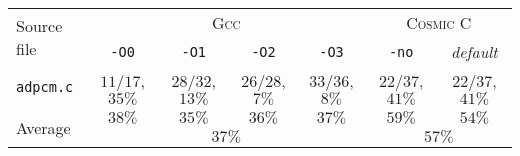 \begin{tabular}{ |l| |c|c|c|c| |c|c| }
  \hline
  \multirow{2}{*}{Source file}
  & \multicolumn{4}{c||}{\textsc{Gcc}}
  & \multicolumn{2}{c|}{\textsc{Cosmic C}}

  \\\cline{2-7}
  & \multicolumn{1}{c|}{\texttt{-O0}} & \multicolumn{1}{c|}{\texttt{-O1}} & \multicolumn{1}{c|}{\texttt{-O2}} & \multicolumn{1}{c||}{\texttt{-O3}}
  & \multicolumn{1}{c|}{\texttt{-no}} & \multicolumn{1}{c|}{\emph{default}}

  \\\hline\hline
  \verb|adpcm.c|
  & $11/17$, $35\%$ & $28/32$, $13\%$ & $26/28$, $7\%$ & $33/36$, $8\%$
  & $22/37$, $41\%$ & $22/37$, $41\%$

    \\\hline\hline
  \multirow{2}{*}{Average}
  & \multicolumn{1}{c|}{$38\%$} & \multicolumn{1}{c|}{$35\%$} & \multicolumn{1}{c|}{$36\%$} & \multicolumn{1}{c||}{$37\%$}
  & \multicolumn{1}{c|}{$59\%$} & \multicolumn{1}{c|}{$54\%$}

  \\\cline{2-7}  
  & \multicolumn{4}{c||}{$37\%$}
  & \multicolumn{2}{c|}{$57\%$}

  \\\hline
\end{tabular}
